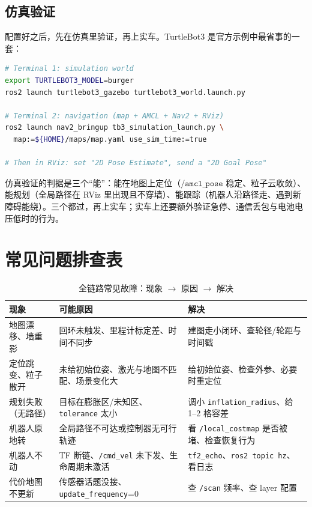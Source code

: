 \subsection{仿真验证}

配置好之后，先在仿真里验证，再上实车。TurtleBot3 是官方示例中最省事的一套：

\begin{lstlisting}[language=bash]
# Terminal 1: simulation world
export TURTLEBOT3_MODEL=burger
ros2 launch turtlebot3_gazebo turtlebot3_world.launch.py

# Terminal 2: navigation (map + AMCL + Nav2 + RViz)
ros2 launch nav2_bringup tb3_simulation_launch.py \
  map:=${HOME}/maps/map.yaml use_sim_time:=true

# Then in RViz: set "2D Pose Estimate", send a "2D Goal Pose"
\end{lstlisting}

仿真验证的判据是三个“能”：能在地图上定位（$\texttt{/amcl\_pose}$ 稳定、粒子云收敛）、能规划（全局路径在 RViz 里出现且不穿墙）、能跟踪（机器人沿路径走、遇到新障碍能绕）。三个都过，再上实车；实车上还要额外验证急停、通信丢包与电池电压低时的行为。

\section{常见问题排查表}\label{sec:22-debug}

\begin{table}[htbp]
  \centering
  \caption{全链路常见故障：现象 $\rightarrow$ 原因 $\rightarrow$ 解决}
  \label{tab:22-debug}
  \small
  \begin{tabular}{p{3.2cm}p{4.6cm}p{4.8cm}}
    \toprule
    现象 & 可能原因 & 解决 \\
    \midrule
    地图漂移、墙重影 & 回环未触发、里程计标定差、时间不同步 & 建图走小闭环、查轮径/轮距与时间戳 \\
    定位跳变、粒子散开 & 未给初始位姿、激光与地图不匹配、场景变化大 & 给初始位姿、检查外参、必要时重定位 \\
    规划失败（无路径） & 目标在膨胀区/未知区、\texttt{tolerance} 太小 & 调小 \texttt{inflation\_radius}、给 1--2 格容差 \\
    机器人原地转 & 全局路径不可达或控制器无可行轨迹 & 看 \texttt{/local\_costmap} 是否被堵、检查恢复行为 \\
    机器人不动 & TF 断链、\texttt{/cmd\_vel} 未下发、生命周期未激活 & \texttt{tf2\_echo}、\texttt{ros2 topic hz}、看日志 \\
    代价地图不更新 & 传感器话题没接、\texttt{update\_frequency}=0 & 查 \texttt{/scan} 频率、查 layer 配置 \\
    \bottomrule
  \end{tabular}
\end{table}

